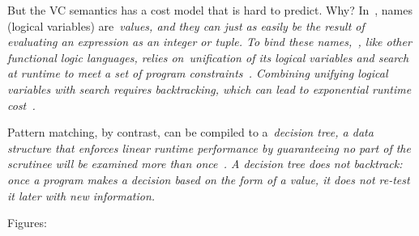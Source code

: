 \documentclass[article,screen,12pt, nonacm]{acmart}
\begin{document}
    But the VC semantics has a cost model that is hard to predict. Why? In~\VC,
    names (logical variables) are~\it{values}, and they can just as easily be
    the result of evaluating an expression as an integer or tuple. To bind these
    names,~\VC, like other functional logic languages, relies
    on~\it{unification} of its logical variables and \it{search} at runtime to
    meet a set of program constraints~\citep{antoy2010functional,
    hanus2013functional}. Combining unifying logical variables with search
    requires backtracking, which can lead to exponential runtime
    cost~\citep{hanus2013functional, wadler1985replace, clark1982introduction}. 


    Pattern matching, by contrast, can be compiled to a~\it{decision tree}, a
    data structure that enforces linear runtime performance by guaranteeing no
    part of the scrutinee will be examined more than once~\citep{maranget}. A
    decision tree does not backtrack: once a program makes a decision based on
    the form of a value, it does not re-test it later with new information. 
    

    Figures: 
\end{document}
